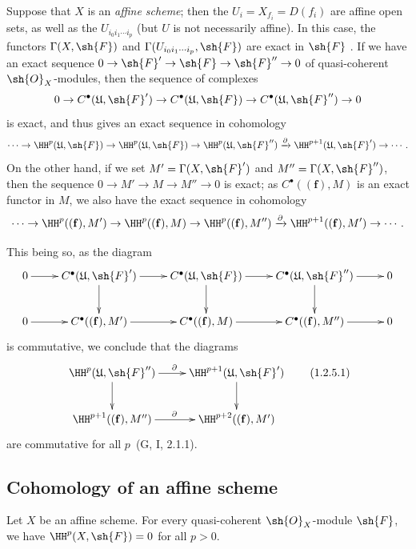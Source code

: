 \begin{remark}[1.2.5]
\label{III.1.2.5}
Suppose that $X$ is an \emph{affine scheme}; then the $U_i=X_{f_i}=D(f_i)$ are affine open sets, as well as the $U_{i_0 i_1\cdots i_p}$ (but $U$ is not necessarily affine).
In this case, the functors $\Gamma(X,\sh{F})$ and $\Gamma(U_{i_0 i_1\cdots i_p},\sh{F})$ are exact in $\sh{F}$ .
If we have an exact sequence $0\to\sh{F}'\to\sh{F}\to\sh{F}''\to 0$ of quasi-coherent $\sh{O}_X$-modules, then the sequence of complexes
\[
  0\to C^\bullet(\mathfrak{U},\sh{F}')\to C^\bullet(\mathfrak{U},\sh{F})\to C^\bullet(\mathfrak{U},\sh{F}'')\to 0
\]
is exact, and thus gives an exact sequence in cohomology
\[
  \cdots\to\HH^p(\mathfrak{U},\sh{F})\to\HH^p(\mathfrak{U},\sh{F})\to\HH^p(\mathfrak{U},\sh{F}'')\xrightarrow{\partial}\HH^{p+1}(\mathfrak{U},\sh{F}')\to\cdots.
\]
On the other hand, if we set $M'=\Gamma(X,\sh{F}')$ and $M''=\Gamma(X,\sh{F}'')$, then the sequence $0\to M'\to M\to M''\to 0$ is exact; as $C^\bullet((\mathbf{f}),M)$ is an exact functor in $M$, we also have the exact sequence in cohomology
\[
  \cdots\to\HH^p((\mathbf{f}),M')\to\HH^p((\mathbf{f}),M)\to\HH^p((\mathbf{f}),M'')\xrightarrow{\partial}\HH^{p+1}((\mathbf{f}),M')\to\cdots.
\]

This being so, as the diagram
\[
  \xymatrix{
    0\ar[r] &
    C^\bullet(\mathfrak{U},\sh{F}')\ar[r]\ar[d] &
    C^\bullet(\mathfrak{U},\sh{F})\ar[r]\ar[d] &
    C^\bullet(\mathfrak{U},\sh{F}'')\ar[r]\ar[d] &
    0\\
    0\ar[r] &
    C^\bullet((\mathbf{f}),M')\ar[r] &
    C^\bullet((\mathbf{f}),M)\ar[r] &
    C^\bullet((\mathbf{f}),M'')\ar[r] &
    0
  }
\]
is commutative, we conclude that the diagrams
\[
  \xymatrix{
    \HH^p(\mathfrak{U},\sh{F}'')\ar[r]^\partial\ar[d] &
    \HH^{p+1}(\mathfrak{U},\sh{F}')\ar[d]\\
    \HH^{p+1}((\mathbf{f}),M'')\ar[r]^\partial &
    \HH^{p+2}((\mathbf{f}),M')
  }
  \tag{1.2.5.1}
\]
are commutative for all $p$~(G, I, 2.1.1).
\end{remark}

\subsection{Cohomology of an affine scheme}
\label{subsection:III.1.3}

\begin{theorem}[1.3.1]
\label{III.1.3.1}
Let $X$ be an affine scheme.
For every quasi-coherent $\sh{O}_X$-module $\sh{F}$, we have $\HH^p(X,\sh{F})=0$ for all $p>0$.
\end{theorem}

